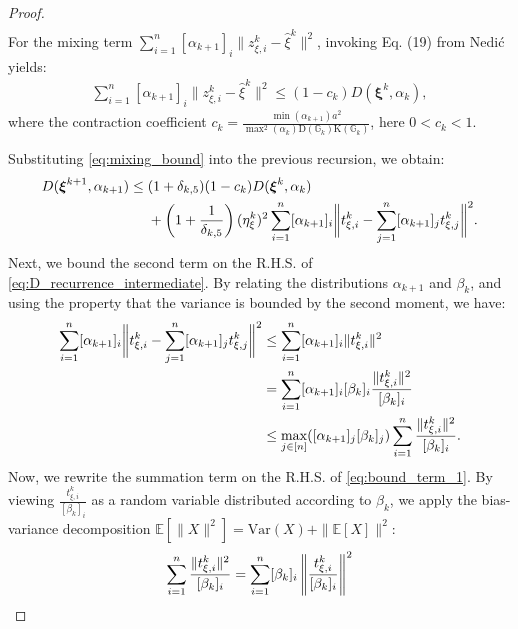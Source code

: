 \documentclass{article}
\theoremstyle{plain}
\theoremstyle{definition}
\theoremstyle{remark}
\begin{document}
\begin{proof}
\begin{align}
\end{align}
For the mixing term $\sum_{i=1}^{n}[\alpha_{k+1}]_{i}\big\|z_{\xi,i}^{k}-\hat{\xi}^{k}\big\|^{2}$, invoking Eq. (19) from Nedić  yields:
\begin{align}\label{eq:mixing_bound}
    \sum_{i=1}^{n}[\alpha_{k+1}]_{i}\big\|z_{\xi,i}^{k}-\hat{\xi}^{k}\big\|^{2} \leq (1-c_{k}) D(\boldsymbol{\xi}^{k},\alpha_{k}),
\end{align}
where the contraction coefficient $c_{k} = \frac{\min(\alpha_{k+1})a^{2}}{\max^{2}(\alpha_{k})\mathrm{D}(\mathbb{G}_{k})\mathrm{K}(\mathbb{G}_{k})}$, here $0<c_{k}<1$.

Substituting \eqref{eq:mixing_bound} into the previous recursion, we obtain:
\begin{align}\label{eq:D_recurrence_intermediate}
    D(\boldsymbol{\xi}^{k+1},\alpha_{k+1}) \leq{}& (1+\delta_{k,5})(1-c_{k})D(\boldsymbol{\xi}^{k},\alpha_{k}) \notag \\
    &+ \left(1+\frac{1}{\delta_{k,5}}\right)(\eta_{\xi}^{k})^{2}\sum_{i=1}^{n}[\alpha_{k+1}]_{i}\bigg\|t_{\xi,i}^{k}-\sum_{j=1}^{n}[\alpha_{k+1}]_{j}t_{\xi,j}^{k}\bigg\|^{2}.
\end{align}
Next, we bound the second term on the R.H.S. of \eqref{eq:D_recurrence_intermediate}. By relating the distributions $\alpha_{k+1}$ and $\beta_k$, and using the property that the variance is bounded by the second moment, we have:
\begin{align}\label{eq:bound_term_1}
    \sum_{i=1}^{n}[\alpha_{k+1}]_{i}\bigg\|t_{\xi,i}^{k}-\sum_{j=1}^{n}[\alpha_{k+1}]_{j}t_{\xi,j}^{k}\bigg\|^{2}
    &\leq \sum_{i=1}^{n}[\alpha_{k+1}]_{i}\|t_{\xi,i}^{k}\|^2 \notag \\
    &= \sum_{i=1}^{n}[\alpha_{k+1}]_{i}[\beta_{k}]_{i}\frac{\|t_{\xi,i}^{k}\|^{2}}{[\beta_{k}]_{i}} \notag \\
    &\leq \max_{j\in[n]}([\alpha_{k+1}]_{j}[\beta_{k}]_{j})\sum_{i=1}^{n}\frac{\|t_{\xi,i}^{k}\|^{2}}{[\beta_{k}]_{i}}.
\end{align}
Now, we rewrite the summation term on the R.H.S. of \eqref{eq:bound_term_1}. By viewing $\frac{t_{\xi,i}^k}{[\beta_k]_i}$ as a random variable distributed according to $\beta_k$, we apply the bias-variance decomposition $\mathbb{E}[\|X\|^2] = \text{Var}(X) + \|\mathbb{E}[X]\|^2$:
\begin{align}\label{eq:bound_term_2}
    \sum_{i=1}^{n}\frac{\|t_{\xi,i}^{k}\|^{2}}{[\beta_{k}]_{i}}
    &= \sum_{i=1}^{n}[\beta_{k}]_{i}\left\|\frac{t_{\xi,i}^{k}}{[\beta_{k}]_{i}}\right\|^{2} \notag \\

\end{align}
\end{proof}
\end{document}
